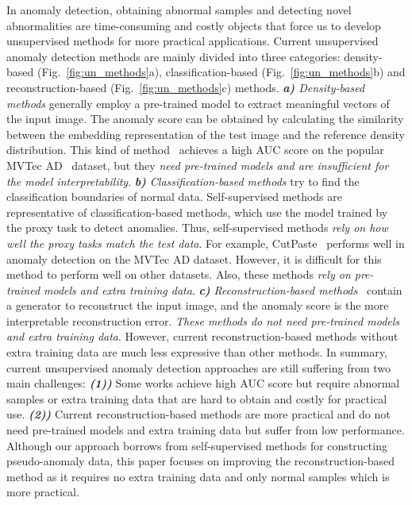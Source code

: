 \documentclass[lettersize,journal]{IEEEtran}
\begin{document}
In anomaly detection, obtaining abnormal samples and detecting novel abnormalities are time-consuming and costly objects that force us to develop unsupervised methods for more practical applications. Current unsupervised anomaly detection methods are mainly divided into three categories: density-based (Fig.~\ref{fig:un_methods}a), classification-based (Fig.~\ref{fig:un_methods}b) and reconstruction-based (Fig.~\ref{fig:un_methods}c) methods. \emph{\textbf{a)} Density-based methods} generally employ a pre-trained model to extract meaningful vectors of the input image. The anomaly score can be obtained by calculating the similarity between the embedding representation of the test image and the reference density distribution. This kind of method~\cite{cohen2020sub,yi2020patch,defard2021padim} achieves a high AUC score on the popular MVTec AD~\cite{bergmann2019mvtec} dataset, but they \emph{need pre-trained models and are insufficient for the model interpretability}. \emph{\textbf{b)} Classification-based methods} try to find the classification boundaries of normal data. Self-supervised methods are representative of classification-based methods, which use the model trained by the proxy task to detect anomalies. Thus, self-supervised methods \emph{rely on how well the proxy tasks match the test data}. For example, CutPaste~\cite{li2021cutpaste} performs well in anomaly detection on the MVTec AD dataset. However, it is difficult for this method to perform well on other datasets. Also, these methods \emph{rely on pre-trained models and extra training data}. \emph{\textbf{c)} Reconstruction-based methods}~\cite{ravanbakhsh2017abnormal,nguyen2019anomaly,xia2021discriminative, hu2020lightweight} contain a generator to reconstruct the input image, and the anomaly score is the more interpretable reconstruction error. \emph{These methods do not need pre-trained models and extra training data}. However, current reconstruction-based methods without extra training data are much less expressive than other methods. In summary, current unsupervised anomaly detection approaches are still suffering from two main challenges: \emph{\textbf{(1))}} Some works achieve high AUC score but require abnormal samples or extra training data that are hard to obtain and costly for practical use. \emph{\textbf{(2))}} Current reconstruction-based methods are more practical and do not need pre-trained models and extra training data but suffer from low performance. Although our approach borrows from self-supervised methods for constructing pseudo-anomaly data, this paper focuses on improving the reconstruction-based method as it requires no extra training data and only normal samples which is more practical.
\end{document}
